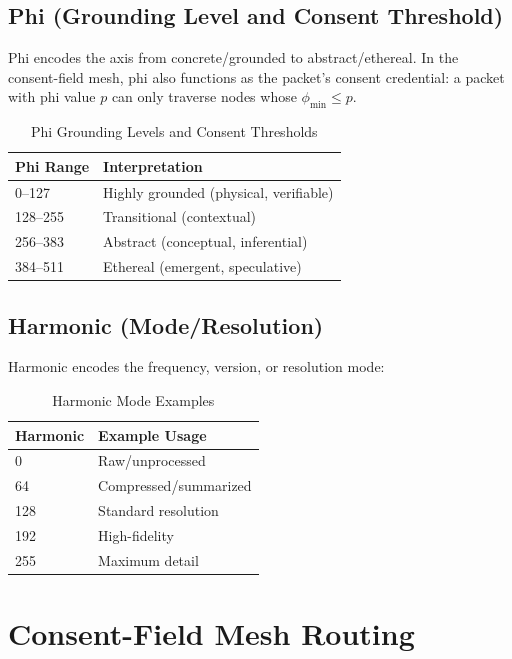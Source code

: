 \documentclass[11pt,a4paper]{article}
\begin{document}
\subsection{Phi (Grounding Level and Consent Threshold)}

Phi encodes the axis from concrete/grounded to abstract/ethereal. In the consent-field mesh, phi also functions as the packet's consent credential: a packet with phi value $p$ can only traverse nodes whose $\phi_{\min} \leq p$.

\begin{table}[h]
\centering
\begin{tabular}{ll}
\toprule
\textbf{Phi Range} & \textbf{Interpretation} \\
\midrule
0--127 & Highly grounded (physical, verifiable) \\
128--255 & Transitional (contextual) \\
256--383 & Abstract (conceptual, inferential) \\
384--511 & Ethereal (emergent, speculative) \\
\bottomrule
\end{tabular}
\caption{Phi Grounding Levels and Consent Thresholds}
\end{table}

\subsection{Harmonic (Mode/Resolution)}

Harmonic encodes the frequency, version, or resolution mode:

\begin{table}[h]
\centering
\begin{tabular}{ll}
\toprule
\textbf{Harmonic} & \textbf{Example Usage} \\
\midrule
0 & Raw/unprocessed \\
64 & Compressed/summarized \\
128 & Standard resolution \\
192 & High-fidelity \\
255 & Maximum detail \\
\bottomrule
\end{tabular}
\caption{Harmonic Mode Examples}
\end{table}

\section{Consent-Field Mesh Routing}
\end{document}

